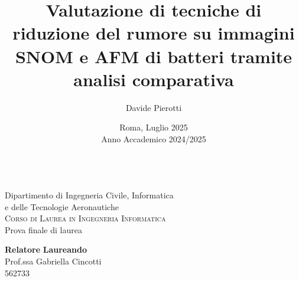 \documentclass[a4paper, 11pt, italian, oneside]{book}
\author{Davide Pierotti}
\date{\normalsize Roma, Luglio 2025\\Anno Accademico 2024/2025}
\title{Valutazione di tecniche di riduzione del rumore su immagini SNOM e AFM di batteri tramite analisi comparativa}
\begin{document}

\frontmatter
\makeatletter

\begin{titlepage}
	\begin{center}
		\\[1cm]

		\large{Dipartimento di Ingegneria Civile, Informatica\\e delle Tecnologie Aeronautiche\\
		\textsc{Corso di Laurea in Ingegneria Informatica}}\\[2cm]

		\bigskip
		Prova finale di laurea
		\medskip

		\textbf{\LARGE\@title}

		\vspace{4 cm}

		\noindent \textbf{Relatore} \hfill \textbf{Laureando} \\
		\noindent Prof.ssa Gabriella Cincotti \hfill \@author \\
		\hfill 562733 \\

		\begin{bottompar}
			\@date
		\end{bottompar}

	\end{center}
\end{titlepage}

\makeatother



\pagestyle{plain}
\setcounter{page}{0}
\tableofcontents
\listoftables
\listoffigures


\mainmatter
{}
\pagestyle{headings}








\end{document}
